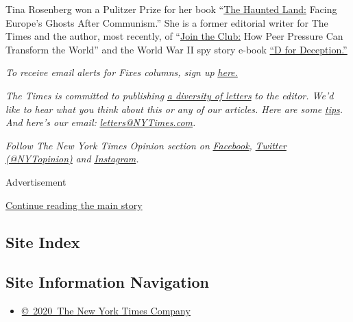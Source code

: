 Tina Rosenberg won a Pulitzer Prize for her book
``\href{http://www.randomhouse.com/catalog/display.pperl?isbn=9780679744993}{The
Haunted Land:} Facing Europe's Ghosts After Communism.'' She is a former
editorial writer for The Times and the author, most recently, of
``\href{http://books.wwnorton.com/books/Join-the-Club}{Join the Club:}
How Peer Pressure Can Transform the World'' and the World War II spy
story e-book
\href{https://www.goodreads.com/book/show/16124470-d-for-deception}{``D
for Deception.''}

\emph{To receive email alerts for Fixes columns, sign up}
\href{http://eepurl.com/ABIxL}{\emph{here.}}

\emph{The Times is committed to publishing}
\href{https://www.nytimes3xbfgragh.onion/2019/01/31/opinion/letters/letters-to-editor-new-york-times-women.html}{\emph{a
diversity of letters}} \emph{to the editor. We'd like to hear what you
think about this or any of our articles. Here are some}
\href{https://help.nytimes3xbfgragh.onion/hc/en-us/articles/115014925288-How-to-submit-a-letter-to-the-editor}{\emph{tips}}\emph{.
And here's our email:}
\href{mailto:letters@NYTimes.com}{\emph{letters@NYTimes.com}}\emph{.}

\emph{Follow The New York Times Opinion section on}
\href{https://www.facebookcorewwwi.onion/nytopinion}{\emph{Facebook}}\emph{,}
\href{http://twitter.com/NYTOpinion}{\emph{Twitter (@NYTopinion)}}
\emph{and}
\href{https://www.instagram.com/nytopinion/}{\emph{Instagram}}\emph{.}

Advertisement

\protect\hyperlink{after-bottom}{Continue reading the main story}

\hypertarget{site-index}{%
\subsection{Site Index}\label{site-index}}

\hypertarget{site-information-navigation}{%
\subsection{Site Information
Navigation}\label{site-information-navigation}}

\begin{itemize}
\tightlist
\item
  \href{https://help.nytimes3xbfgragh.onion/hc/en-us/articles/115014792127-Copyright-notice}{©~2020~The
  New York Times Company}
\end{itemize}

